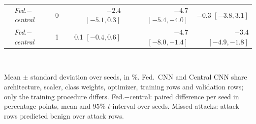 \begin{table}[t]
\begin{tabular}{lllrrrrr}
 & \emph{Fed.$-$central} & 0 & & $-2.4$ $[-5.1, 0.3]$ & & $-4.7$ $[-5.4, -4.0]$ & $-0.3$ $[-3.8, 3.1]$ \\
 & \emph{Fed.$-$central} & 1 & & 0.1 $[-0.4, 0.6]$ & & $-4.7$ $[-8.0, -1.4]$ & $-3.4$ $[-4.9, -1.8]$ \\
\bottomrule
\end{tabular}
\\[2pt]
\parbox{\linewidth}{\scriptsize Mean $\pm$ standard deviation over  seeds, in \%. Fed.\ CNN and Central CNN share architecture, scaler, class weights, optimizer, training rows and validation rows; only the training procedure differs. Fed.$-$central: paired difference per seed in percentage points, mean and 95\% $t$-interval over seeds. Missed attacks: attack rows predicted benign over attack rows.}
\end{table}
